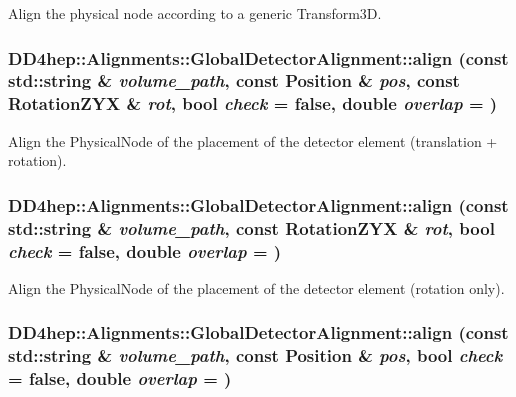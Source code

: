 Align the physical node according to a generic Transform3D. \hypertarget{class_d_d4hep_1_1_alignments_1_1_global_detector_alignment_a9024ad900cf469292555be0b54ad1d60}{
\subsubsection[{align}]{ DD4hep::Alignments::GlobalDetectorAlignment::align (const std::string \& {\em volume\_\-path}, \/  const Position \& {\em pos}, \/  const RotationZYX \& {\em rot}, \/  bool {\em check} = {\ttfamily false}, \/  double {\em overlap} = {})}}
\label{class_d_d4hep_1_1_alignments_1_1_global_detector_alignment_a9024ad900cf469292555be0b54ad1d60}


Align the PhysicalNode of the placement of the detector element (translation + rotation). \hypertarget{class_d_d4hep_1_1_alignments_1_1_global_detector_alignment_a6a1950c5f869be07e7291660bbbd4fde}{
\subsubsection[{align}]{ DD4hep::Alignments::GlobalDetectorAlignment::align (const std::string \& {\em volume\_\-path}, \/  const RotationZYX \& {\em rot}, \/  bool {\em check} = {\ttfamily false}, \/  double {\em overlap} = {})}}
\label{class_d_d4hep_1_1_alignments_1_1_global_detector_alignment_a6a1950c5f869be07e7291660bbbd4fde}


Align the PhysicalNode of the placement of the detector element (rotation only). \hypertarget{class_d_d4hep_1_1_alignments_1_1_global_detector_alignment_a215336c1b789db3fc12eccbd207a028d}{
\subsubsection[{align}]{ DD4hep::Alignments::GlobalDetectorAlignment::align (const std::string \& {\em volume\_\-path}, \/  const Position \& {\em pos}, \/  bool {\em check} = {\ttfamily false}, \/  double {\em overlap} = {})}}
\label{class_d_d4hep_1_1_alignments_1_1_global_detector_alignment_a215336c1b789db3fc12eccbd207a028d}


